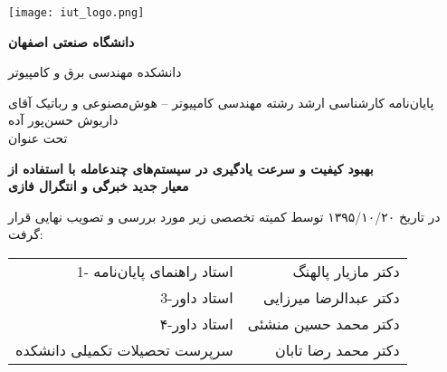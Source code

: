 \thispagestyle{empty}
\begin{center}
\texttt{[image: iut\_logo.png]}
\vspace{0.4cm}

\textbf{دانشگاه صنعتی اصفهان}\\
\vspace{0.4cm}

{\large
	دانشکده مهندسی برق و کامپیوتر
}
\vspace{1.8cm}

\vfill

{\Large
	پایان‌نامه کارشناسی ارشد رشته مهندسی کامپیوتر -- هوش‌مصنوعی و رباتیک آقای داریوش حسن‌پور آده\\
	\vspace{.3cm}
	تحت عنوان\\
}


\end{center}

\begin{center}
{\large
	\textbf{بهبود کیفیت و سرعت یادگیری در سیستم‌های چندعامله با استفاده از\\
	معیار جدید خبرگی و انتگرال فازی}
}
\end{center}
\vspace*{1.8cm}
در تاریخ ۱۳۹۵/۱۰/۲۰ توسط کمیته تخصصی زیر مورد بررسی و تصویب نهایی قرار گرفت:\\

{\normalsize
	
	\begin{tabular}{rr}
	\vspace*{.8cm}
	1- استاد راهنمای پایان‌نامه  & \hspace{2cm} دکتر مازیار پالهنگ \\
	\vspace{.8cm}
	3-استاد داور &\hspace{2cm} دکتر عبدالرضا میرزایی \\
	\vspace{.8cm}
	۴-استاد داور &\hspace{2cm} دکتر محمد حسین منشئی \\
	\vspace{.8cm}
	سرپرست تحصیلات تکمیلی دانشکده &\hspace{2cm} دکتر محمد رضا تابان \\
	\end{tabular}
}
\restoregeometry
\pagebreak

\thispagestyle{empty}
\vspace*{1.5cm}

